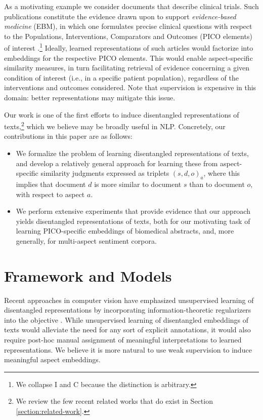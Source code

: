 \documentclass[11pt,a4paper]{article}
\begin{document}
As a motivating example we consider documents that describe clinical trials. Such publications constitute the evidence drawn upon to support \emph{evidence-based medicine} (EBM), in which one formulates precise clinical questions with respect to the Populations, Interventions, Comparators and Outcomes (PICO elements) of interest \cite{sackett1996evidence}.\footnote{We collapse I and C because the distinction is arbitrary.} Ideally, learned representations of such articles would factorize into embeddings for the respective PICO elements. This would enable aspect-specific similarity measures, in turn facilitating retrieval of evidence concerning a given condition of interest (i.e., in a specific patient population), regardless of the interventions and outcomes considered. Note that supervision is expensive in this domain: better representations may mitigate this issue.

Our work is one of the first efforts to induce disentangled representations of texts,\footnote{We review the few recent related works that do exist in Section \ref{section:related-work}.} which we believe may be broadly useful in NLP. Concretely, our contributions in this paper are as follows:

\vspace{-.4em}
\begin{itemize}[leftmargin=1.0em]
\item We formalize the problem of learning disentangled representations of texts, and develop a relatively general approach for learning these from aspect-specific similarity judgments expressed as triplets $(s, d, o)_a$, where this implies that document $d$ is more similar to document $s$ than to document $o$, with respect to aspect $a$.
\vspace{-.5em}
\item We perform extensive experiments that provide evidence that our approach yields disentangled representations of texts, both for our motivating task of learning PICO-specific embeddings of biomedical abstracts, and, more generally, for multi-aspect sentiment corpora.
\end{itemize}

\vspace{-.65em}
\section{Framework and Models}
\vspace{-.5em}
Recent approaches in computer vision have emphasized unsupervised learning of disentangled representations by incorporating information-theoretic regularizers into the objective \cite{chen2016infogan,higgins2017beta-vae}. While unsupervised learning of disentangled embeddings of texts would alleviate the need for any sort of explicit annotations, it would also require post-hoc manual assignment of meaningful interpretations to learned representations. We believe it is more natural to use weak supervision to induce meaningful aspect embeddings.
\end{document}
